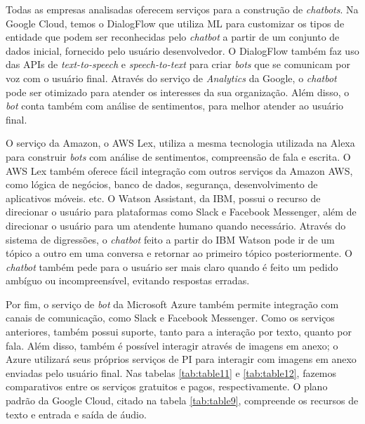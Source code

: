 \documentclass{article}
\begin{document}
Todas as empresas analisadas oferecem serviços para a construção de \textit{chatbots}. Na Google Cloud, temos o DialogFlow que utiliza ML para customizar os tipos de entidade que podem ser reconhecidas pelo \textit{chatbot} a partir de um conjunto de dados inicial, fornecido pelo usuário desenvolvedor. O DialogFlow também faz uso das APIs de \textit{text-to-speech} e \textit{speech-to-text} para criar \textit{bots} que se comunicam por voz com o usuário final. Através do serviço de \textit{Analytics} da Google, o \textit{chatbot} pode ser otimizado para atender os interesses da sua organização. Além disso, o \textit{bot} conta também com análise de sentimentos, para melhor atender ao usuário final. 

O serviço da Amazon, o AWS Lex, utiliza a mesma tecnologia utilizada na Alexa para construir \textit{bots} com análise de sentimentos, compreensão de fala e escrita. O AWS Lex também oferece fácil integração com outros serviços da Amazon AWS, como lógica de negócios, banco de dados, segurança, desenvolvimento de aplicativos móveis. etc. O Watson Assistant, da IBM, possui o recurso de direcionar o usuário para plataformas como Slack e Facebook Messenger, além de direcionar o usuário para um atendente humano quando necessário. Através do sistema de digressões, o \textit{chatbot} feito a partir do IBM Watson pode ir de um tópico a outro em uma conversa e retornar ao primeiro tópico posteriormente. O \textit{chatbot} também pede para o usuário ser mais claro quando é feito um pedido ambíguo ou incompreensível, evitando respostas erradas. 

Por fim, o serviço de \textit{bot} da Microsoft Azure também permite integração com canais de comunicação, como Slack e Facebook Messenger. Como os serviços anteriores, também possui suporte, tanto para a interação por texto, quanto por fala. Além disso, também é possível interagir através de imagens em anexo; o Azure utilizará seus próprios serviços de PI para interagir com imagens em anexo enviadas pelo usuário final. Nas tabelas \ref{tab:table11} e \ref{tab:table12}, fazemos comparativos entre os serviços gratuitos e pagos, respectivamente. 
O plano padrão da Google Cloud, citado na tabela \ref{tab:table9}, compreende os recursos de texto e entrada e saída de áudio.
\end{document}
